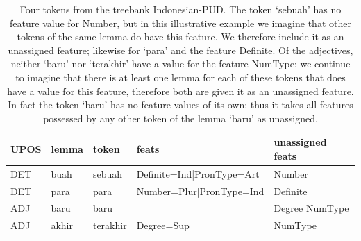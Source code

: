 \documentclass[USenglish]{article}
\begin{document}
\begin{table}[ht]
    \centering
    \caption{Four tokens from the treebank Indonesian-PUD. The token `sebuah' has no feature value for Number, but in this illustrative example we imagine that other tokens of the same lemma do have this feature. We therefore include it as an unassigned feature; likewise for `para' and the feature Definite. Of the adjectives, neither `baru' nor `terakhir' have a value for the feature NumType; we continue to imagine that there is at least one lemma for each of these tokens that does have a value for this feature, therefore both are given it as an unassigned feature. In fact the token `baru' has no feature values of its own; thus it takes all features possessed by any other token of the lemma `baru' as unassigned.} %
    \label{tab:unassigned_ex}   
    \begin{tabular}{p{1cm}p{1.4cm}p{1.5cm}p{3.5cm}p{2.5cm}}
\toprule

UPOS&lemma	&token	&feats & unassigned feats	\\ 
\midrule
DET & buah & sebuah 
& Definite=Ind|PronType=Art
& Number
\\\midrule
DET & para	& para	&Number=Plur|PronType=Ind & Definite
\\\midrule
ADJ&baru	&baru&
& Degree \newline
NumType 
\\\midrule
ADJ & akhir	&terakhir&	Degree=Sup& NumType\\\bottomrule
\end{tabular}
\end{table}
\end{document}
